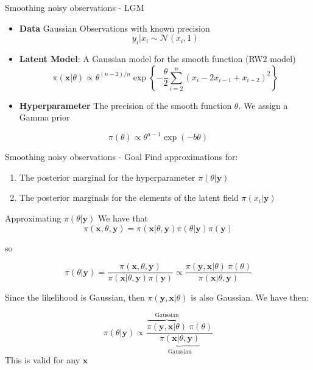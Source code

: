 \documentclass[
  ignorenonframetext,
]{beamer}
\providecommand{\tightlist}{%
  \setlength{\itemsep}{0pt}\setlength{\parskip}{0pt}}
\begin{document}
\begin{frame}{Smoothing noisy observations - LGM}
\protect\hypertarget{smoothing-noisy-observations---lgm}{}
\begin{itemize}
\item
  \textbf{Data} Gaussian Observations with known precision \[
    y_i|x_i\sim\mathcal{N}(x_i,1)
  \]
\item
  \textbf{Latent Model}: A Gaussian model for the smooth function (RW2
  model) \[
    \pi({\mathbf x}|\theta)\propto \theta^{(n-2)/n}\exp\left\{
    -\frac{\theta}{2}\sum_{i=2}^n(x_i-2x_{i-1}+x_{i-2})^2
    \right\}
  \]
\item
  \textbf{Hyperparameter} The precision of the smooth function
  \(\theta\). We assign a Gamma prior
\end{itemize}

\[
    \pi(\theta)\propto\theta^{a-1}\exp(-b\theta)
\]
\end{frame}

\begin{frame}{Smoothing noisy observations - Goal}
\protect\hypertarget{smoothing-noisy-observations---goal}{}
Find approximations for:

\begin{enumerate}
\tightlist
\item
  The posterior marginal for the hyperparameter
  \(\pi(\theta|\mathbf{y})\)
\item
  The posterior marginals for the elements of the latent field
  \(\pi(x_i|\mathbf{y})\)
\end{enumerate}
\end{frame}

\begin{frame}{Approximating \(\pi(\theta|\mathbf{y})\)}
\protect\hypertarget{approximating-pithetamathbfy}{}
We have that \[
\pi(\mathbf{x},\theta,\mathbf{y}) = \pi(\mathbf{x}|\theta,\mathbf{y})\pi(\theta|\mathbf{y})\pi(\mathbf{y})
\]

so

\[
    \pi(\theta|\mathbf{y}) = \frac{\pi(\mathbf{x},\theta,\mathbf{y})}{\pi(\mathbf{x}|\theta,\mathbf{y})\pi(\mathbf{y})} \propto\frac{
  \pi(\mathbf{y}, \mathbf{x}|\theta)\  \pi(\theta)
    }{\pi(\mathbf{x}|\theta,\mathbf{y})}
\]

\pause

Since the likelihood is Gaussian, then
\(\pi(\mathbf{y}, \mathbf{x}|\theta)\) is also Gaussian. We have then:

\[
   \pi(\theta|\mathbf{y})  \propto \frac{
  \overbrace{\pi(\mathbf{y}, \mathbf{x}|\theta)}^{\text{Gaussian}}\  \pi(\theta)}
  {\underbrace{\pi(\mathbf{x}|\theta,\mathbf{y})}_{\text{Gaussian}}}
\] This is valid for any \(\mathbf{x}\)
\end{frame}
\end{document}
